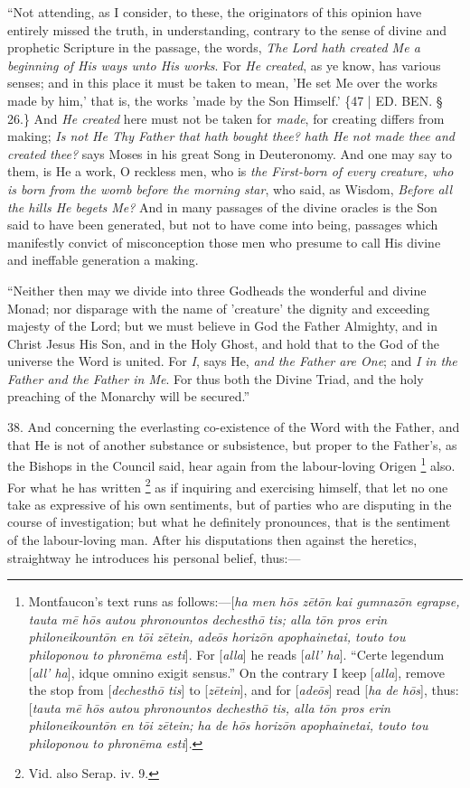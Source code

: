``Not attending, as I consider,
to these, the originators of this opinion have entirely missed the
truth, in understanding, contrary to the sense of divine and prophetic
Scripture in the passage, the words, \emph{The Lord hath created Me a}
\emph{beginning of His ways unto His works}. For \emph{He created}, as
ye know, has various senses; and in this place it must be taken to
mean, 'He set Me over the works made by him,' that is, the works 'made
by the Son Himself.' \{47 | ED.
BEN.
§ 26.\} And \emph{He created} here must not be taken for \emph{made},
for creating differs from making; \emph{Is not He Thy Father that hath
bought thee? hath He not made thee and created thee?} says Moses in
his great Song in Deuteronomy. And one may say to them, is He a work,
O reckless men, who is \emph{the First-born of every creature, who is
born from the womb before the morning star}, who said, as Wisdom, \emph{Before
all the hills He begets Me?} And in many passages of the divine
oracles is the Son said to have been generated, but not to have come
into being, passages which manifestly convict of misconception those
men who presume to call His divine and ineffable generation a making.

``Neither then may we divide
into three Godheads the wonderful and divine Monad; nor disparage with
the name of 'creature' the dignity and exceeding majesty of the Lord;
but we must believe in God the Father Almighty, and in Christ Jesus
His Son, and in the Holy Ghost, and hold that to the God of the
universe the Word is united. For \emph{I}, says He, \emph{and the Father
are One}; and \emph{I in the Father and the Father in Me}. For thus
both the Divine Triad, and the holy preaching of the Monarchy will be
secured.''

38. And concerning the
everlasting co-existence of the Word with the Father, and that He is
not of another substance or subsistence, but proper to the Father's,
as the Bishops in the Council said, hear again from the labour-loving
Origen \footnote{Montfaucon's text runs as follows:—[\emph{ha men h\={o}s z\={e}t\={o}n
kai gumnaz\={o}n egrapse, tauta m\={e} h\={o}s autou
phronountos dechesth\={o} tis; alla t\={o}n pros erin
philoneikount\={o}n en t\={o}i z\={e}tein, ade\={o}s horiz\={o}n
apophainetai, touto tou philoponou to phron\={e}ma esti}]. For [\emph{alla}]
he reads [\emph{all' ha}]. ``Certe legendum [\emph{all' ha}], idque
omnino exigit sensus.'' On the contrary I keep [\emph{alla}], remove
the stop from [\emph{dechesth\={o} tis}] to [\emph{z\={e}tein}],
and for [\emph{ade\={o}s}] read [\emph{ha de h\={o}s}], thus: [\emph{tauta
m\={e} h\={o}s autou phronountos dechesth\={o} tis, alla t\={o}n
pros erin philoneikount\={o}n en t\={o}i z\={e}tein; ha de h\={o}s
horiz\={o}n apophainetai, touto tou philoponou to phron\={e}ma
esti}].} also. For what
he has written \footnote{Vid. also Serap. iv. 9.} as if inquiring and exercising himself, that let no one take as
expressive of his own sentiments, but of parties who are disputing in
the course of investigation; but what he definitely pronounces, that
is the sentiment of the labour-loving man. After his disputations then
against the heretics, straightway he introduces his personal belief,
thus:—

